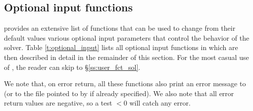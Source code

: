 \subsection{Optional input functions}\label{ss:optional_input}

{\kinsol} provides an extensive list of functions that can be used to change
from their default values various optional input parameters that control the
behavior of the {\kinsol} solver. 
Table \ref{t:optional_input} lists all optional input functions in {\kinsol} which 
are then described in detail in the remainder of this section.
For the most casual use of {\kinsol}, the reader can skip to \S\ref{ss:user_fct_sol}.

We note that, on error return, all these functions also print an error message
to  (or to the file pointed to by  if already specified).
We also note that all error return values are negative, so a test $<0$
will catch any error.

